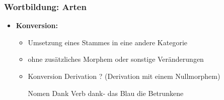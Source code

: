 \begin{frame}
\frametitle{Wortbildung: Arten}

\begin{itemize}
\item \textbf{Konversion:}

\begin{itemize}
\item Umsetzung eines Stammes in eine andere Kategorie
\item ohne zusätzliches Morphem oder sonstige Veränderungen
\item Konversion \ras Derivation ? (Derivation mit einem Nullmorphem)

\eal 
\ex Nomen Dank \vs Verb dank-
\ex das Blau
\ex die Betrunkene
\zl

\end{itemize}

\end{itemize}


\end{frame}


%
%
%
%
%


%
%
%
%
%


